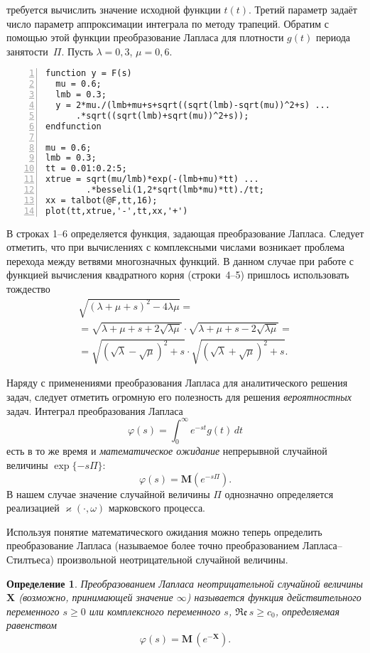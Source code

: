 \documentclass[12pt]{extarticle}
\newcommand{\M}{{\mathbf M}}
\newtheorem{definition}{\color{CadetBlue}Определение}
\begin{document}
требуется вычислить значение исходной функции $t(t)$. Третий параметр задаёт
число параметр аппроксимации интеграла по методу трапеций. Обратим с помощью этой
функции преобразование Лапласа для плотности $g(t)$ периода занятости~$\Pi$. Пусть
$\lambda=0{,}3$, $\mu=0{,}6$. 
\begin{Verbatim}[frame=single,xleftmargin=2em,numbers=left]
function y = F(s)
  mu = 0.6;
  lmb = 0.3;
  y = 2*mu./(lmb+mu+s+sqrt((sqrt(lmb)-sqrt(mu))^2+s) ...
      .*sqrt((sqrt(lmb)+sqrt(mu))^2+s));
endfunction

mu = 0.6;
lmb = 0.3;
tt = 0.01:0.2:5;
xtrue = sqrt(mu/lmb)*exp(-(lmb+mu)*tt) ...
        .*besseli(1,2*sqrt(lmb*mu)*tt)./tt;
xx = talbot(@F,tt,16);
plot(tt,xtrue,'-',tt,xx,'+')
\end{Verbatim}

В строках 1--6 определяется функция, задающая преобразование Лапласа. Следует
отметить, что при вычислениях с комплексными числами возникает проблема перехода
между ветвями многозначных функций. В данном случае при работе с
функцией вычисления квадратного корня (строки~4--5) пришлось использовать
тождество
\begin{multline*}
\sqrt{(\lambda+\mu+s)^2-4\lambda\mu}=
\\ =
\sqrt{\lambda+\mu+s+2\sqrt{\lambda\mu}} \cdot
\sqrt{\lambda+\mu+s-2\sqrt{\lambda\mu}}=
\\ =
\sqrt{(\sqrt\lambda-\sqrt\mu)^2+s} \cdot
\sqrt{(\sqrt\lambda+\sqrt\mu)^2+s}.
\end{multline*}


Наряду с применениями преобразования Лапласа для аналитического решения задач,
следует отметить огромную его полезность для решения \emph{вероятностных}
задач. Интеграл преобразования Лапласа
\[
\varphi(s)=\int_0^\infty e^{-st}g(t)\,dt
\]
есть в то же время и \emph{математическое ожидание} непрерывной случайной
величины $\exp\{-s\Pi\}$:
\[
\varphi(s)=\M( e^{-s\Pi}).
\] 
В нашем случае значение случайной величины $\Pi$
однозначно определяется реализацией $\varkappa(\cdot, \omega)$ марковского
процесса. 

Используя понятие математического ожидания можно теперь определить
преобразование Лапласа (называемое более точно преобразованием
Лапласа--Стилтьеса) произвольной неотрицательной случайной величины.
\begin{definition}
  Преобразованием Лапласа неотрицательной случайной величины $\boldsymbol{X}$
  (возможно, принимающей значение $\infty$) называется функция действительного
  переменного $s\geqslant0$ или комплексного переменного $s$, 
  $\mathfrak{Re}\,s\geqslant c_0$, определяемая равенством
  \[
  \varphi(s)=\M\,(e^{-\boldsymbol{X}}).
  \]
\end{definition}
\end{document}
